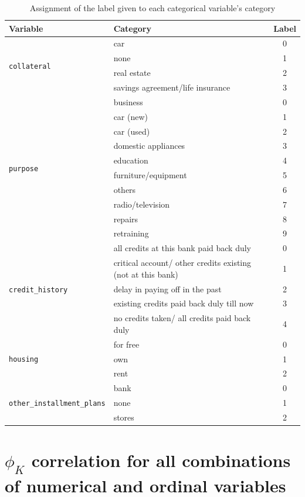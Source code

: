 \documentclass{ieeeaccess}
\begin{document}
\begin{table}[!t]
  \caption{Assignment of the label given to each categorical variable's category}
  \label{tab:label_categorical}
  \centering
  \begin{tabular}{llc}
    \toprule
    Variable & Category & Label \\
    \midrule
    \multirow{4}{*}{\texttt{collateral}}
      & car & 0 \\
      & none & 1 \\
      & real estate & 2 \\
      & savings agreement/life insurance & 3 \\
    \midrule
    \multirow{10}{*}{\texttt{purpose}}
      & business & 0 \\
      & car (new) & 1 \\
      & car (used) & 2 \\
      & domestic appliances & 3 \\
      & education & 4 \\
      & furniture/equipment & 5 \\
      & others & 6 \\
      & radio/television & 7 \\
      & repairs & 8 \\
      & retraining & 9 \\
    \midrule
    \multirow{5}{*}{\texttt{credit\_history}}
      & all credits at this bank paid back duly & 0 \\
      & critical account/ other credits existing (not at this bank) & 1 \\
      & delay in paying off in the past & 2 \\
      & existing credits paid back duly till now & 3 \\
      & no credits taken/ all credits paid back duly & 4 \\
    \midrule
    \multirow{3}{*}{\texttt{housing}}
      & for free & 0 \\
      & own & 1 \\
      & rent & 2 \\
    \midrule
    \multirow{3}{*}{\texttt{other\_installment\_plans}}
      & bank & 0 \\
      & none & 1 \\
      & stores & 2 \\
    \bottomrule
  \end{tabular}
\end{table}

\section{$\phi_{K}$ correlation for all combinations of numerical and ordinal variables}
\label{ap:phik_numerical_ordinal}
\end{document}
